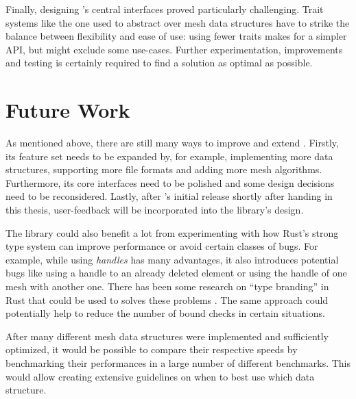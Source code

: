 Finally, designing 's central interfaces proved particularly challenging.
Trait systems like the one used to abstract over mesh data structures have to strike the balance between flexibility and ease of use:
using fewer traits makes for a simpler API, but might exclude some use-cases.
Further experimentation, improvements and testing is certainly required to find a solution as optimal as possible.

\vspace{1cm}

\newpage
\section{Future Work}

As mentioned above, there are still many ways to improve and extend .
Firstly, its feature set needs to be expanded by, for example, implementing more data structures, supporting more file formats and adding more mesh algorithms.
Furthermore, its core interfaces need to be polished and some design decisions need to be reconsidered.
Lastly, after 's initial release shortly after handing in this thesis, user-feedback will be incorporated into the library's design.

The library could also benefit a lot from experimenting with how Rust's strong type system can improve performance or avoid certain classes of bugs.
For example, while using \emph{handles} has many advantages, it also introduces potential bugs like using a handle to an already deleted element or using the handle of one mesh with another one.
There has been some research on \enquote{type branding} in Rust that could be used to solves these problems \cite{beingessner2016you, indexing}.
The same approach could potentially help to reduce the number of bound checks in certain situations.

After many different mesh data structures were implemented and sufficiently optimized, it would be possible to compare their respective speeds by benchmarking their performances in a large number of different benchmarks.
This would allow creating extensive guidelines on when to best use which data structure.


